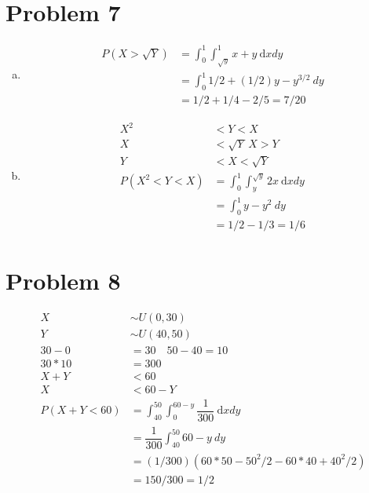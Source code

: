 \documentclass{article}
\newcommand{\dx}{\mathrm{d}x}
\begin{document}
\begin{flushleft}
\section*{Problem 7}
\begin{enumerate}[(a)]
\item 
\begin{align*}
P(X>\sqrt{Y})&=\int_{0}^{1}\int_{\sqrt{y}}^{1} x+y \ \dx dy\\
&=\int_{0}^{1}1/2+(1/2)y-y^{3/2} \ dy\\
&=1/2+1/4-2/5=7/20
\end{align*}
\item
\begin{align*}
X^2&<Y<X\\
X&<\sqrt{Y} \ X>Y\\
Y&<X<\sqrt{Y}\\
P(X^2<Y<X)&=\int_{0}^{1}\int_{y}^{\sqrt{y}}2x \ \dx dy\\
&=\int_{0}^{1}y-y^2 \ dy\\
&=1/2-1/3=1/6
\end{align*}
\end{enumerate}
\section*{Problem 8}
\begin{align*}
X&\sim U(0,30)\\
Y&\sim U(40,50)\\
30-0&=30  \quad 50-40=10\\
30*10&=300\\
X+Y&<60\\
X&<60-Y\\
P(X+Y<60)&=\int_{40}^{50}\int_{0}^{60-y}\dfrac{1}{300} \ \dx dy\\
&=\dfrac{1}{300}\int_{40}^{50}60-y \ dy\\
&=(1/300)(60*50-50^2/2-60*40+40^2/2)\\
&=150/300=1/2
\end{align*}
\pagebreak

\end{flushleft}
\end{document}
